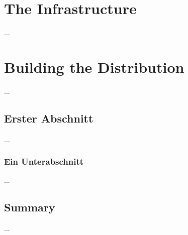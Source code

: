 
\chapter{The  Infrastructure}
\label{cha:Infrastructure}

...



% 



\chapter{Building the  Distribution}
\label{cha:Distribution}

...

\section{Erster Abschnitt}

...

\subsection{Ein Unterabschnitt}

...



\section{Summary}

...
